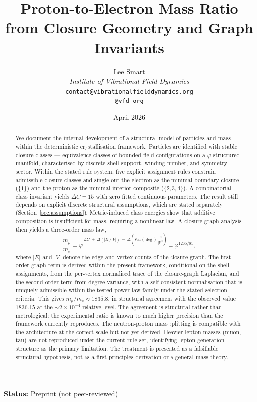 \documentclass[12pt]{article}
\title{Proton-to-Electron Mass Ratio from Closure Geometry and Graph Invariants}
\author{%
  Lee Smart\\[4pt]
  \textit{Institute of Vibrational Field Dynamics}\\[2pt]
  \texttt{contact@vibrationalfielddynamics.org}\\[2pt]
  \texttt{@vfd\_org}%
}
\date{April 2026}
\newcommand{\phig}{\varphi}
\begin{document}
\maketitle

\noindent\textbf{Status:} Preprint (not peer-reviewed)

\begin{abstract}
We document the internal development of a structural model of particles and mass within the deterministic crystallisation framework. Particles are identified with stable closure classes --- equivalence classes of bounded field configurations on a $\phig$-structured manifold, characterised by discrete shell support, winding number, and symmetry sector. Within the stated rule system, five explicit assignment rules constrain admissible closure classes and single out the electron as the minimal boundary closure ($\{1\}$) and the proton as the minimal interior composite ($\{2,3,4\}$). A combinatorial class invariant yields $\Delta C = 15$ with zero fitted continuous parameters. The result still depends on explicit discrete structural assumptions, which are stated separately (Section~\ref{sec:assumptions}). Metric-induced class energies show that additive composition is insufficient for mass, requiring a nonlinear law. A closure-graph analysis then yields a three-order mass law,
\[
\frac{m_p}{m_e} = \phig^{\,\Delta C \;+\; \Delta(|E|/|V|) \;-\; \Delta\!\left(\mathrm{Var}(\deg)\,\frac{|E|}{|V|^2}\right)} = \phig^{1265/81},
\]
where $|E|$ and $|V|$ denote the edge and vertex counts of the closure graph. The first-order graph term is derived within the present framework, conditional on the shell assignments, from the per-vertex normalised trace of the closure-graph Laplacian, and the second-order term from degree variance, with a self-consistent normalisation that is uniquely admissible within the tested power-law family under the stated selection criteria. This gives $m_p/m_e \approx 1835.8$, in structural agreement with the observed value $1836.15$ at the $\sim\!2 \times 10^{-4}$ relative level. The agreement is structural rather than metrological: the experimental ratio is known to much higher precision than the framework currently reproduces. The neutron-proton mass splitting is compatible with the architecture at the correct scale but not yet derived. Heavier lepton masses (muon, tau) are not reproduced under the current rule set, identifying lepton-generation structure as the primary limitation. The treatment is presented as a falsifiable structural hypothesis, not as a first-principles derivation or a general mass theory.
\end{abstract}
\end{document}
